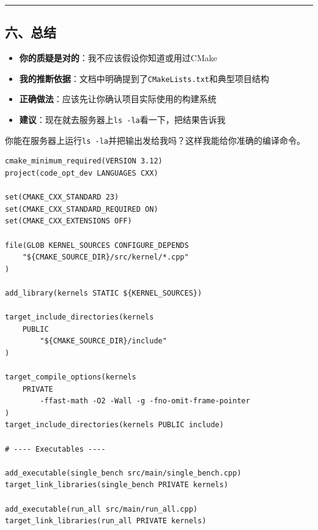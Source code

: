 \documentclass[11pt, a4paper]{article}
\begin{document}
\begin{aibox}
\begin{center}\rule{\textwidth}{0.4pt}\end{center}

\subsection*{六、总结}

\begin{itemize}
    \item \textbf{你的质疑是对的}：我不应该假设你知道或用过CMake
    \item \textbf{我的推断依据}：文档中明确提到了\texttt{CMakeLists.txt}和典型项目结构
    \item \textbf{正确做法}：应该先让你确认项目实际使用的构建系统
    \item \textbf{建议}：现在就去服务器上\texttt{ls -la}看一下，把结果告诉我
\end{itemize}

你能在服务器上运行\texttt{ls -la}并把输出发给我吗？这样我能给你准确的编译命令。
\end{aibox}

\vspace{1.5em}

\begin{userbox}
\begin{verbatim}
cmake_minimum_required(VERSION 3.12)
project(code_opt_dev LANGUAGES CXX)

set(CMAKE_CXX_STANDARD 23)
set(CMAKE_CXX_STANDARD_REQUIRED ON)
set(CMAKE_CXX_EXTENSIONS OFF)

file(GLOB KERNEL_SOURCES CONFIGURE_DEPENDS
    "${CMAKE_SOURCE_DIR}/src/kernel/*.cpp"
)

add_library(kernels STATIC ${KERNEL_SOURCES})

target_include_directories(kernels
    PUBLIC
        "${CMAKE_SOURCE_DIR}/include"
)

target_compile_options(kernels
    PRIVATE
        -ffast-math -O2 -Wall -g -fno-omit-frame-pointer
)
target_include_directories(kernels PUBLIC include)

# ---- Executables ----

add_executable(single_bench src/main/single_bench.cpp)
target_link_libraries(single_bench PRIVATE kernels)

add_executable(run_all src/main/run_all.cpp)
target_link_libraries(run_all PRIVATE kernels)
\end{verbatim}
\end{userbox}
\end{document}
